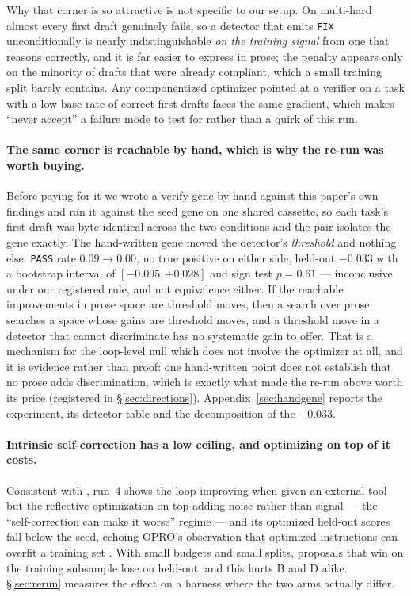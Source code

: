 \documentclass[11pt]{article}
\begin{document}
Why that corner is so attractive is not specific to our setup. On multi-hard almost every first
draft genuinely fails, so a detector that emits \texttt{FIX} unconditionally is nearly
indistinguishable \emph{on the training signal} from one that reasons correctly, and it is far
easier to express in prose; the penalty appears only on the minority of drafts that were already
compliant, which a small training split barely contains. Any componentized optimizer pointed at a
verifier on a task with a low base rate of correct first drafts faces the same gradient, which
makes ``never accept'' a failure mode to test for rather than a quirk of this run.

\paragraph{The same corner is reachable by hand, which is why the re-run was worth buying.}
Before paying for it we wrote a verify gene by hand against this paper's own findings and ran it
against the seed gene on one shared cassette, so each task's first draft was byte-identical across
the two conditions and the pair isolates the gene exactly. The hand-written gene moved the
detector's \emph{threshold} and nothing else: \texttt{PASS} rate $0.09 \to 0.00$, no true positive
on either side, held-out $-0.033$ with a bootstrap interval of $[-0.095,+0.028]$ and sign test
$p=0.61$ --- inconclusive under our registered rule, and not equivalence either. If the reachable
improvements in prose space are threshold moves, then a search over prose searches a space whose
gains are threshold moves, and a threshold move in a detector that cannot discriminate has no
systematic gain to offer. That is a mechanism for the loop-level null which does not involve the
optimizer at all, and it is evidence rather than proof: one hand-written point does not establish
that no prose adds discrimination, which is exactly what made the re-run above worth its price
(registered in \S\ref{sec:directions}). Appendix~\ref{sec:handgene} reports the experiment, its
detector table and the decomposition of the $-0.033$.

\paragraph{Intrinsic self-correction has a low ceiling, and optimizing on top of it
costs.} Consistent with \citet{huang2023cannot}, run~4 shows the loop improving when given an
external tool but the reflective optimization on top adding noise rather than signal --- the
``self-correction can make it worse'' regime --- and its optimized held-out scores fall below
the seed, echoing OPRO's observation that optimized instructions can overfit a training set
\citep{yang2023opro}. With small budgets and small splits, proposals that win on the training
subsample lose on held-out, and this hurts B and D alike. \S\ref{sec:rerun} measures the
effect on a harness where the two arms actually differ.
\end{document}
